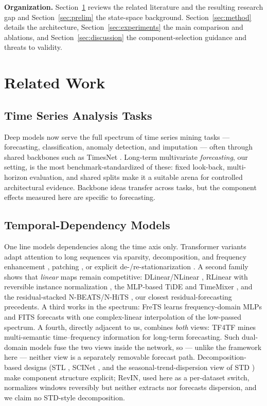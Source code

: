 \documentclass[review,12pt]{elsarticle}
\begin{document}
\noindent\textbf{Organization.} Section~\ref{sec:related} reviews the
related literature and the resulting research gap and
Section~\ref{sec:prelim} the state-space background.
Section~\ref{sec:method} details the architecture,
Section~\ref{sec:experiments} the main comparison and ablations, and
Section~\ref{sec:discussion} the component-selection guidance and threats
to validity.

\section{Related Work}
\label{sec:related}

\subsection{Time Series Analysis Tasks}
Deep models now serve the full spectrum of time series mining tasks ---
forecasting, classification, anomaly detection, and imputation --- often
through shared backbones such as TimesNet \cite{timesnet}. Long-term
multivariate \emph{forecasting}, our setting, is the most
benchmark-standardized of these: fixed look-back, multi-horizon evaluation,
and shared splits \cite{informer,itransformer} make it a suitable arena for
controlled architectural evidence. Backbone ideas transfer across tasks, but
the component effects measured here are specific to forecasting.

\subsection{Temporal-Dependency Models}
One line models dependencies along the time axis only. Transformer variants
adapt attention to long sequences via sparsity, decomposition, and frequency
enhancement
\cite{informer,autoformer,fedformer}, patching \cite{patchtst}, or explicit
de-/re-stationarization \cite{nonstationary}. A second family shows that
\emph{linear} maps remain competitive: DLinear/NLinear \cite{dlinear},
RLinear with reversible instance normalization \cite{rlinear,revin}, the
MLP-based TiDE \cite{tide} and TimeMixer \cite{timemixer}, and the
residual-stacked N-BEATS/N-HiTS \cite{nbeats,nhits}, our closest
residual-forecasting precedents. A third works in the spectrum: FreTS
\cite{frets} learns frequency-domain MLPs and FITS \cite{fits} forecasts
with one complex-linear interpolation of the low-passed spectrum. A fourth,
directly adjacent to us, combines \emph{both} views: TF4TF \cite{tf4tf}
mines multi-semantic time--frequency information for long-term forecasting.
Such dual-domain models fuse the two views inside the network, so --- unlike
the framework here --- neither view is a separately removable forecast path.
Decomposition-based designs (STL \cite{stl}, SCINet \cite{scinet}, and the
seasonal-trend-dispersion view of STD \cite{std}) make component structure
explicit; RevIN, used here as a per-dataset switch, normalizes windows
reversibly but neither extracts nor forecasts dispersion, and we claim no
STD-style decomposition.
\end{document}

